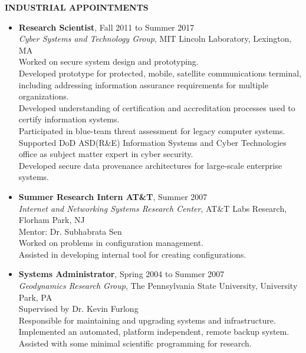 \documentclass[10pt]{article}
\begin{document}
\vspace{1em} {\Large \textbf{INDUSTRIAL APPOINTMENTS}}
\begin{itemize}
\item \textbf{Research Scientist}, Fall 2011 to Summer 2017\\
  \textit{Cyber Systems and Technology Group}, MIT Lincoln Laboratory, Lexington, MA\\
  Worked on secure system design and prototyping.\\
  Developed prototype for protected, mobile, satellite communications terminal, including addressing information assurance requirements for multiple organizations.\\
  Developed understanding of certification and accreditation processes used to certify information systems.\\
  Participated in blue-team threat assessment for legacy computer systems.\\
  Supported DoD ASD(R\&E) Information Systems and Cyber Technologies office as subject matter expert in cyber security.\\
  Developed secure data provenance architectures for large-scale enterprise systems.\\
  
\item \textbf{Summer Research Intern AT\&T}, Summer 2007\\
  \textit{Internet and Networking Systems Research Center}, AT\&T Labs
  Research,
  Florham Park, NJ\\
  Mentor: Dr. Subhabrata Sen\\
  Worked on problems in configuration management.\\
  Assisted in developing internal tool for creating configurations.

\item \textbf{Systems Administrator}, Spring 2004 to Summer 2007\\
  \textit{Geodynamics Research Group}, The Pennsylvania State University,
  University Park, PA\\
  Supervised by Dr. Kevin Furlong\\
  Responsible for maintaining and upgrading systems and
  infrastructure.\\
  Implemented an automated, platform independent, remote backup
  system.\\
  Assisted with some minimal scientific programming for research.
\end{itemize}
\end{document}

